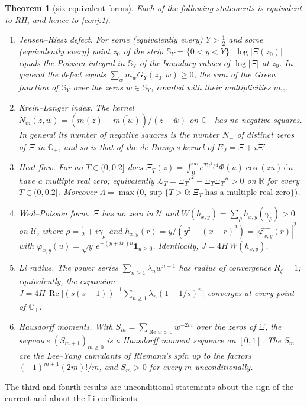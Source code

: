 \documentclass[11pt]{article}
\newtheorem{theorem}{Theorem}[section]
\theoremstyle{definition}\newtheorem{definition}[theorem]{Definition}
\theoremstyle{remark}\newtheorem{remark}[theorem]{Remark}
\newcommand{\R}{\mathbb R}\newcommand{\C}{\mathbb C}\newcommand{\N}{\mathbb N}
\newcommand{\dd}{\,\mathrm d}\newcommand{\e}{\mathrm e}
\renewcommand{\Re}{\operatorname{Re}}\renewcommand{\Im}{\operatorname{Im}}
\begin{document}
\begin{theorem}[six equivalent forms]\label{mt:six}
Each of the following statements is equivalent to RH, and hence to \cref{conj:1}.
\begin{enumerate}[label=(\alph*)]
\item \emph{Jensen--Riesz defect.} For some (equivalently every) $Y>\frac12$ and some (equivalently every) point $z_0$ of the strip $\mathbb S_Y=\{0<y<Y\}$, $\log|\Xi(z_0)|$ equals the Poisson integral in $\mathbb S_Y$ of the boundary values of $\log|\Xi|$ at $z_0$. In general the defect equals $\sum_wm_wG_Y(z_0,w)\ge0$, the sum of the Green function of $\mathbb S_Y$ over the zeros $w\in\mathbb S_Y$, counted with their multiplicities $m_w$.
\item \emph{Krein--Langer index.} The kernel $N_m(z,w)=(m(z)-\overline{m(w)})/(z-\bar w)$ on $\C_+$ has no negative squares. In general its number of negative squares is the number $N_+$ of distinct zeros of $\Xi$ in $\C_+$, and so is that of the de Branges kernel of $E_J=\Xi+i\Xi'$.
\item \emph{Heat flow.} For no $T\in(0,0.2]$ does $\Xi_T(z)=\int_0^\infty e^{Tu^2/4}\Phi(u)\cos(zu)\dd u$ have a multiple real zero; equivalently $\mathcal L_T=\Xi_T'^2-\Xi_T\Xi_T''>0$ on $\R$ for every $T\in(0,0.2]$. Moreover $\Lambda=\max\bigl(0,\sup\{T>0:\Xi_T\text{ has a multiple real zero}\}\bigr)$.
\item \emph{Weil--Poisson form.} $\Xi$ has no zero in $\mathcal U$ and $W(h_{x,y})=\sum_\rho h_{x,y}(\gamma_\rho)>0$ on $\mathcal U$, where $\rho=\frac12+i\gamma_\rho$ and $h_{x,y}(r)=y/(y^2+(x-r)^2)=|\widehat{\varphi_{x,y}}(r)|^2$ with $\varphi_{x,y}(u)=\sqrt y\,e^{-(y+ix)u}\mathbf 1_{u\ge0}$. Identically, $J=4H\,W(h_{x,y})$.
\item \emph{Li radius.} The power series $\sum_{n\ge1}\lambda_nw^{n-1}$ has radius of convergence $R_\zeta=1$; equivalently, the expansion $J=4H\,\Re\bigl[(s(s-1))^{-1}\sum_{n\ge1}\lambda_n(1-1/s)^n\bigr]$ converges at every point of $\C_+$.
\item \emph{Hausdorff moments.} With $S_m=\sum_{\Re w>0}w^{-2m}$ over the zeros of $\Xi$, the sequence $(S_{m+1})_{m\ge0}$ is a Hausdorff moment sequence on $[0,1]$. The $S_m$ are the Lee--Yang cumulants of Riemann's spin up to the factors $(-1)^{m+1}(2m)!/m$, and $S_m>0$ for every $m$ unconditionally.
\end{enumerate}
\end{theorem}

The third and fourth results are unconditional statements about the sign of the current and about the Li coefficients.
\end{document}
